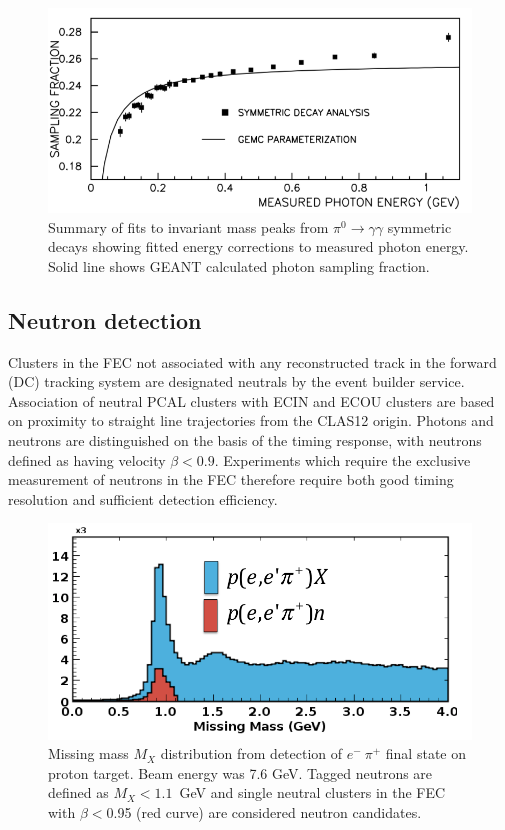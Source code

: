 \begin{figure}[h]
\centering
\includegraphics[width=1.0\columnwidth,keepaspectratio]{img/fx-study-summary-2.png}
\caption[]{Summary of fits to invariant mass peaks from $\pi^0 \rightarrow \gamma \gamma$ symmetric decays showing fitted energy corrections to measured photon energy.  Solid line shows GEANT calculated photon sampling fraction.}
\label{fig:fx-study-summary-2}
\end{figure}

\subsection{Neutron detection}
Clusters in the FEC not associated with any reconstructed track in the forward (DC) tracking system are designated neutrals by the event builder service.  Association of neutral PCAL clusters with ECIN and ECOU clusters are based on proximity to straight line trajectories from the CLAS12 origin.  Photons and neutrons are distinguished on the basis of the timing response, with neutrons defined as having velocity $\beta < 0.9$.  Experiments which require the exclusive measurement of neutrons in the FEC therefore require both good timing resolution and sufficient detection efficiency. 

\begin{figure}[h]
\centering
\includegraphics[width=1.0\columnwidth,keepaspectratio]{img/S10_4_0.png}
\caption[]{Missing mass $M_X$ distribution from detection of $e^-~\pi^+$ final state on proton target.  Beam energy was 7.6 GeV.  Tagged neutrons are defined as $M_X < 1.1$~GeV and single neutral clusters in the FEC with $\beta<$0.95 (red curve) are considered neutron candidates.}
\label{fig:S10_4_0}
\end{figure}

